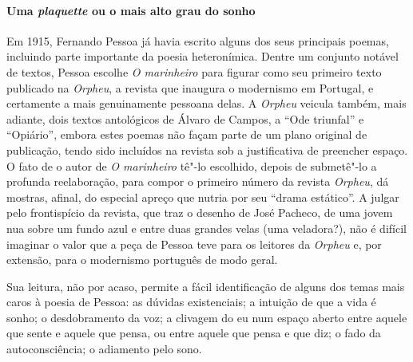 \paragraph{Uma \textit{plaquette} ou o mais alto grau do sonho}

Em 1915, Fernando Pessoa já havia escrito alguns dos 
seus principais
poemas, incluindo parte importante da poesia 
heteronímica. Dentre um
conjunto notável de textos, Pessoa escolhe
\textit{O marinheiro} para
figurar como seu primeiro texto publicado na
\textit{Orpheu}, a revista
que inaugura o modernismo em Portugal,
e certamente a mais genuinamente
pessoana delas. A \textit{Orpheu} veicula 
também, mais adiante, dois
textos antológicos de Álvaro de Campos, a
“Ode triunfal” e “Opiário”,
embora estes poemas não façam parte de um plano
original de publicação,
tendo sido incluídos na revista sob a justificativa de preencher
espaço. O fato de o autor de \textit{O marinheiro}
tê"-lo escolhido,
depois de submetê"-lo a profunda reelaboração,
para compor o primeiro
número da revista \textit{Orpheu}, dá mostras, afinal, do especial
apreço que nutria por seu “drama estático”.
A julgar pelo frontispício
da revista, que traz o desenho de José Pacheco,
de uma jovem nua sobre
um fundo azul e entre duas grandes velas 
(uma veladora?), não é difícil
imaginar o valor que a peça de Pessoa teve
para os leitores da \textit{Orpheu}
e, por extensão, para o modernismo português de modo geral. 

Sua leitura, não por acaso, permite a fácil
identificação de alguns dos
temas mais caros à poesia de Pessoa: as dúvidas existenciais; a
intuição de que a vida é sonho; o desdobramento
da voz; a clivagem do
eu num espaço aberto entre aquele que sente e aquele
que pensa, ou entre
aquele que pensa e que diz; o fado da autoconsciência; 
o adiamento pelo sono. 

